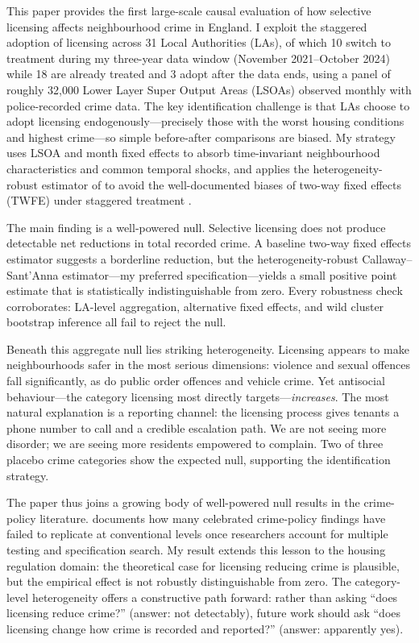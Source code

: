 \documentclass[12pt]{article}
\begin{document}
This paper provides the first large-scale causal evaluation of how selective licensing affects neighbourhood crime in England. I exploit the staggered adoption of licensing across 31 Local Authorities (LAs), of which 10 switch to treatment during my three-year data window (November 2021--October 2024) while 18 are already treated and 3 adopt after the data ends, using a panel of roughly 32{,}000 Lower Layer Super Output Areas (LSOAs) observed monthly with police-recorded crime data. The key identification challenge is that LAs choose to adopt licensing endogenously---precisely those with the worst housing conditions and highest crime---so simple before-after comparisons are biased. My strategy uses LSOA and month fixed effects to absorb time-invariant neighbourhood characteristics and common temporal shocks, and applies the heterogeneity-robust estimator of \citet{callaway2021} to avoid the well-documented biases of two-way fixed effects (TWFE) under staggered treatment \citep{goodmanbacon2021, dechaisemartin2020}.

The main finding is a well-powered null. Selective licensing does not produce detectable net reductions in total recorded crime. A baseline two-way fixed effects estimator suggests a borderline reduction, but the heterogeneity-robust Callaway--Sant'Anna estimator---my preferred specification---yields a small positive point estimate that is statistically indistinguishable from zero. Every robustness check corroborates: LA-level aggregation, alternative fixed effects, and wild cluster bootstrap inference all fail to reject the null.

Beneath this aggregate null lies striking heterogeneity. Licensing appears to make neighbourhoods safer in the most serious dimensions: violence and sexual offences fall significantly, as do public order offences and vehicle crime. Yet antisocial behaviour---the category licensing most directly targets---\emph{increases}. The most natural explanation is a reporting channel: the licensing process gives tenants a phone number to call and a credible escalation path. We are not seeing more disorder; we are seeing more residents empowered to complain. Two of three placebo crime categories show the expected null, supporting the identification strategy.

The paper thus joins a growing body of well-powered null results in the crime-policy literature. \citet{chalfin2022} documents how many celebrated crime-policy findings have failed to replicate at conventional levels once researchers account for multiple testing and specification search. My result extends this lesson to the housing regulation domain: the theoretical case for licensing reducing crime is plausible, but the empirical effect is not robustly distinguishable from zero. The category-level heterogeneity offers a constructive path forward: rather than asking ``does licensing reduce crime?'' (answer: not detectably), future work should ask ``does licensing change how crime is recorded and reported?'' (answer: apparently yes).
\end{document}
